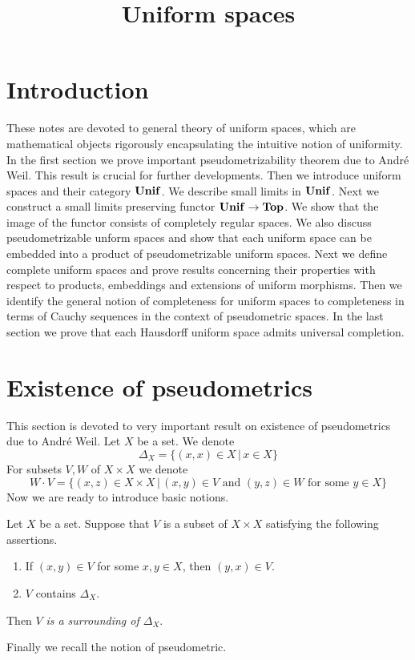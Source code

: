 



\title{Uniform spaces}
\date{}
\maketitle

\section{Introduction}
\noindent
These notes are devoted to general theory of uniform spaces, which are mathematical objects rigorously encapsulating the intuitive notion of uniformity. In the first section we prove  important pseudometrizability theorem due to Andr{\'e} Weil. This result is crucial for further developments. Then we introduce uniform spaces and their category $\mathbf{Unif}$. We describe small limits in $\mathbf{Unif}$. Next we construct a small limits preserving functor $\mathbf{Unif}\rightarrow \mathbf{Top}$. We show that the image of the functor consists of completely regular spaces. We also discuss pseudometrizable unform spaces and show that each uniform space can be embedded into a product of pseudometrizable uniform spaces. Next we define complete uniform spaces and prove results concerning their properties with respect to products, embeddings and extensions of uniform morphisms. Then we identify the general notion of completeness for uniform spaces  to completeness in terms of Cauchy sequences in the context of pseudometric spaces. In the last section we prove that each Hausdorff uniform space admits universal completion.

\section{Existence of pseudometrics}
\noindent
This section is devoted to very important result on existence of pseudometrics due to Andr{\'e} Weil. Let $X$ be a set. We denote 
$$\Delta_X = \big\{(x,x)\in X\,\big|\,x\in X\big\}$$
For subsets $V,W$ of $X\times X$ we denote
$$W\cdot V = \big\{(x,z)\in X\times X\,\big|\,(x,y)\in V\mbox{ and }(y,z)\in W\mbox{ for some }y\in X\big\}$$
Now we are ready to introduce basic notions.

\begin{definition}
Let $X$ be a set. Suppose that $V$ is a subset of $X\times X$ satisfying the following assertions.
\begin{enumerate}[label=\textbf{(\arabic*)}, leftmargin=*]
\item If $(x,y)\in V$ for some $x,y\in X$, then $(y,x)\in V$.
\item $V$ contains $\Delta_X$.
\end{enumerate}
Then $V$ \textit{is a surrounding of $\Delta_X$}.
\end{definition}
\noindent
Finally we recall the notion of pseudometric.

